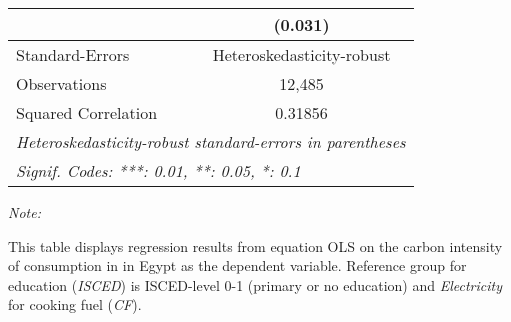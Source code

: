 \begin{table}[htbp!]
\begin{adjustbox}{width = 1\textwidth, max height = 0.95\textheight, center}
\begin{threeparttable}[b]
\begin{tabular}{lc}
                                & (0.031)\\   
            \midrule 
            Standard-Errors     & Heteroskedasticity-robust \\   
            Observations        & 12,485\\  
            Squared Correlation & 0.31856\\  
            \midrule \midrule
            \multicolumn{2}{l}{\emph{Heteroskedasticity-robust standard-errors in parentheses}}\\
            \multicolumn{2}{l}{\emph{Signif. Codes: ***: 0.01, **: 0.05, *: 0.1}}\\
         \end{tabular}
         
         \begin{tablenotes}\item \medskip \textit{Note:}
            \item This table displays regression results from equation OLS on the carbon intensity of consumption in  in Egypt as the dependent variable. Reference group for education (\textit{ISCED}) is ISCED-level 0-1 (primary or no education) and \textit{Electricity} for cooking fuel (\textit{CF}).
         \end{tablenotes}
      \end{threeparttable}
   \end{adjustbox}
\end{table}


